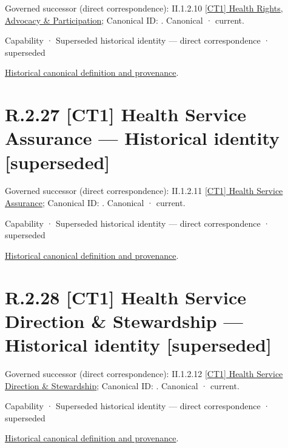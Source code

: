 {\small Governed successor (direct correspondence): II.1.2.10 \hyperref[element:7ab5c82a500b45f39267883a6e78c482]{[CT1] Health Rights, Advocacy \& Participation}; Canonical ID: \texttt{}. Canonical · current.}\par
\label{element:58376e5c53bf4af0a54f99f21ac52666}
{\small Capability · Superseded historical identity — direct correspondence · superseded}\par
\href{../../../../../../../continuum/strategy/capability/58376e5c53bf4af0a54f99f21ac52666.md}{Historical canonical definition and provenance}.\par
\section*{R.2.27 [CT1] Health Service Assurance — Historical identity [superseded]}
\label{navigation:R.2.27}

{\small Governed successor (direct correspondence): II.1.2.11 \hyperref[element:14860102964c441681d41ec3da423fe0]{[CT1] Health Service Assurance}; Canonical ID: \texttt{}. Canonical · current.}\par
\label{element:6a82dc1423374e809dbf542eeaa69482}
{\small Capability · Superseded historical identity — direct correspondence · superseded}\par
\href{../../../../../../../continuum/strategy/capability/6a82dc1423374e809dbf542eeaa69482.md}{Historical canonical definition and provenance}.\par
\section*{R.2.28 [CT1] Health Service Direction \& Stewardship — Historical identity [superseded]}
\label{navigation:R.2.28}

{\small Governed successor (direct correspondence): II.1.2.12 \hyperref[element:d51e7125bf9c4d2c9c59b60346b4d86f]{[CT1] Health Service Direction \& Stewardship}; Canonical ID: \texttt{}. Canonical · current.}\par
\label{element:360bf50f92484448a01cc57f2dbce23c}
{\small Capability · Superseded historical identity — direct correspondence · superseded}\par
\href{../../../../../../../continuum/strategy/capability/360bf50f92484448a01cc57f2dbce23c.md}{Historical canonical definition and provenance}.\par
